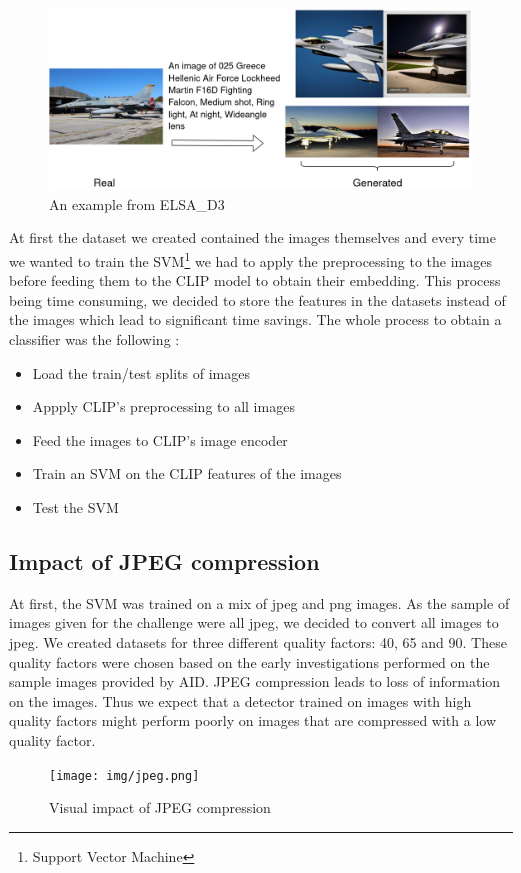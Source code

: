 \documentclass[12pt,a4paper]{article}
\begin{document}
\begin{figure}[H]
    \includegraphics*[width=\textwidth]{img/ELSA.png}
    \caption{An example from ELSA\_D3}
\end{figure}

At first the dataset we created contained the images themselves and every time we wanted to train the SVM\footnote{Support Vector Machine} we had to apply the preprocessing to the images before feeding them to the CLIP model to obtain their embedding. This process being time consuming, we decided to store the features in the datasets instead of the images which lead to significant time savings. The whole process to obtain a classifier was the following :
\begin{itemize}
    \item Load the train/test splits of images
    \item Appply CLIP's preprocessing to all images
    \item Feed the images to CLIP's image encoder
    \item Train an SVM on the CLIP features of the images
    \item Test the SVM
\end{itemize}

\subsection{Impact of JPEG compression}
At first, the SVM was trained on a mix of jpeg and png images. As the sample of images given for the challenge were all jpeg, we decided to convert all images to jpeg. We created datasets for three different quality factors: 40, 65 and 90. These quality factors were chosen based on the early investigations performed on the sample images provided by AID. JPEG compression leads to loss of information on the images. Thus we expect that a detector trained on images with high quality factors might perform poorly on  images that are compressed with a low quality factor. 
\begin{figure}[H]
    \texttt{[image: img/jpeg.png]}
    \vspace*{-.8cm}
    \caption{Visual impact of JPEG compression}
\end{figure}
\end{document}
